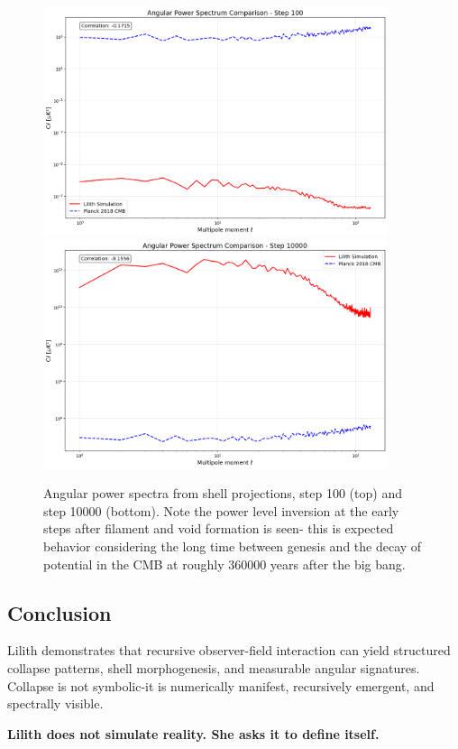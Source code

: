 \begin{figure}[ht]
  \centering
  \includegraphics[width=0.9\textwidth]{images/power_spectrum_000100.png}
  \includegraphics[width=0.9\textwidth]{images/power_spectrum_010000.png}
  \caption{Angular power spectra from shell projections, step 100 (top) and step 10000 (bottom). Note the power level inversion at the early steps after filament and void formation is seen- this is expected behavior considering the long time between genesis and the decay of potential in the CMB at roughly 360000 years after the big bang.}
\end{figure}


\subsection{Conclusion}
Lilith demonstrates that recursive observer-field interaction can yield structured collapse patterns, shell morphogenesis, and measurable angular signatures. Collapse is not symbolic-it is numerically manifest, recursively emergent, and spectrally visible.

\textbf{Lilith does not simulate reality. She asks it to define itself.}
